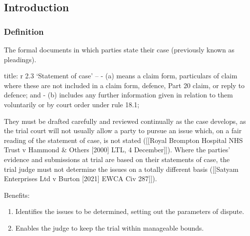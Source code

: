\documentclass[
]{article}
\newenvironment{Shaded}{}{}
\newcommand{\NormalTok}[1]{#1}
\providecommand{\tightlist}{%
  \setlength{\itemsep}{0pt}\setlength{\parskip}{0pt}}
\begin{document}
\hypertarget{introduction}{%
\subsection{Introduction}\label{introduction}}

\hypertarget{definition}{%
\subsubsection{Definition}\label{definition}}

\begin{Shaded}
\begin{Highlighting}[]
\NormalTok{The formal documents in which parties state their case (previously known as pleadings). }
\end{Highlighting}
\end{Shaded}

\begin{Shaded}
\begin{Highlighting}[]
\NormalTok{title: r 2.3}
\NormalTok{‘Statement of case’ –}
\NormalTok{{-} (a) means a claim form, particulars of claim where these are not included in a claim form, defence, Part 20 claim, or reply to defence; and}
\NormalTok{{-} (b) includes any further information given in relation to them voluntarily or by court order under rule 18.1;}
\end{Highlighting}
\end{Shaded}

They must be drafted carefully and reviewed continually as the case
develops, as the trial court will not usually allow a party to pursue an
issue which, on a fair reading of the statement of case, is not stated
({[}{[}Royal Brompton Hospital NHS Trust v Hammond \& Others {[}2000{]}
LTL, 4 December{]}{]}). Where the parties' evidence and submissions at
trial are based on their statements of case, the\\
trial judge must not determine the issues on a totally different basis
({[}{[}Satyam Enterprises Ltd v Burton {[}2021{]} EWCA Civ 287{]}{]}).

Benefits:

\begin{enumerate}
\def\labelenumi{\arabic{enumi}.}
\tightlist
\item
  Identifies the issues to be determined, setting out the parameters of
  dispute.
\item
  Enables the judge to keep the trial within manageable bounds.
\end{enumerate}
\end{document}
